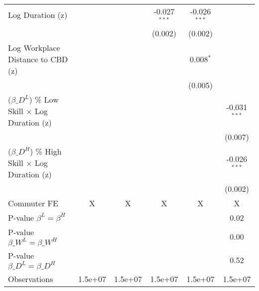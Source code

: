 {\begin{tabular}{l*{5}{c}}
\addlinespace
\quad Log Duration (z)&                    &                    &      -0.027$^{***}$&      -0.026$^{***}$&                    \\
            &                    &                    &     (0.002)        &     (0.002)        &                    \\
\addlinespace
\quad Log Workplace Distance to CBD (z) &                    &                    &                    &       0.008$^{*}$  &                    \\
            &                    &                    &                    &     (0.005)        &                    \\
\addlinespace
\quad ($\beta\_D^L$) \% Low Skill $\times$ Log Duration (z) &                    &                    &                    &                    &      -0.031$^{***}$\\
            &                    &                    &                    &                    &     (0.007)        \\
\addlinespace
\quad ($\beta\_D^H$) \% High Skill $\times$ Log Duration (z) &                    &                    &                    &                    &      -0.026$^{***}$\\
            &                    &                    &                    &                    &     (0.002)        \\
\midrule
Commuter FE &           X        &           X        &           X        &           X        &           X        \\
P-value $\beta^L=\beta^H$&                    &                    &                    &                    &        0.02        \\
P-value $\beta\_W^L=\beta\_W^H$&                    &                    &                    &                    &        0.00        \\
P-value $\beta\_D^L=\beta\_D^H$&                    &                    &                    &                    &        0.52        \\
Observations&     1.5e+07        &     1.5e+07        &     1.5e+07        &     1.5e+07        &     1.5e+07        \\
\bottomrule
\end{tabular}
}
